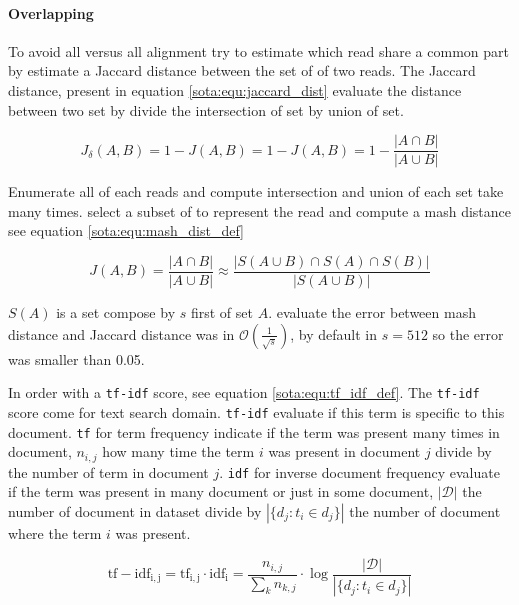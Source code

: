\documentclass[main]{subfiles}
\begin{document}
\paragraph{Overlapping}


To avoid all versus all alignment \mhap try to estimate which read share a common part by estimate a Jaccard distance between the set of \kmers of two reads. The Jaccard distance, present in equation \ref{sota:equ:jaccard_dist} evaluate the distance between two set by divide the intersection of set by union of set.

\begin{equation}
J_{\delta}(A,B) = 1 - J(A,B) = 1 -  J(A,B) = 1 - \frac{|A \cap B|}{|A \cup B|}
\label{sota:equ:jaccard_dist}
\end{equation}

Enumerate all \kmers of each reads and compute intersection and union of each set take many times. \mhap select a subset of \kmers to represent the read and compute a mash distance \cite{mash_distance} see equation \ref{sota:equ:mash_dist_def} 

\begin{equation}
J(A,B) = \frac{|A \cap B|}{|A \cup B|} \approx \frac{|S(A \cup B) \cap S(A) \cap S(B)|}{|S(A \cup B)|}
\label{sota:equ:mash_dist_def}
\end{equation}

$S(A)$ is a \kmers set compose by $s$ first \kmers of set $A$. \citeauthor{mash_distance} evaluate the error between mash distance and Jaccard distance was in $\mathcal{O}(\frac{1}{\sqrt{s}})$, by default in \mhap $s=512$ so the error was smaller than 0.05.

In \mhap order \kmer with a \texttt{tf-idf} score, see equation \ref{sota:equ:tf_idf_def}. The \texttt{tf-idf} score come for text search domain. \texttt{tf-idf} evaluate if this term is specific to this document. \texttt{tf} for term frequency indicate if the term was present many times in document, $n_{i,j}$ how many time the term $i$ was present in document $j$ divide by the number of term in document $j$. \texttt{idf} for inverse document frequency evaluate if the term was present in many document or just in some document, $|\mathcal{D}|$ the number of document in dataset divide by $|\{d_{j}:t_{i}\in d_{j}\}|$ the number of document where the term $i$ was present.

\begin{equation}
\mathrm{tf-idf_{i,j}} = \mathrm{tf_{i,j}} \cdot \mathrm{idf_{i}} = \frac{n_{i,j}}{\sum_{k}n_{k,j}} \cdot \log{\frac  {|\mathcal{D}|}{|\{d_{j}:t_{i}\in d_{j}\}|}}
\label{sota:equ:tf_idf_def}
\end{equation}
\end{document}
